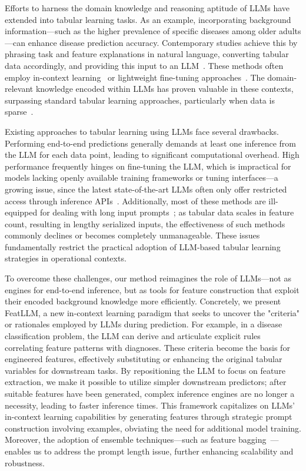 Efforts to harness the domain knowledge and reasoning aptitude of LLMs have extended into tabular learning tasks. As an example, incorporating background information—such as the higher prevalence of specific diseases among older adults—can enhance disease prediction accuracy. Contemporary studies achieve this by phrasing task and feature explanations in natural language, converting tabular data accordingly, and providing this input to an LLM~\cite{dinh2022lift,wang2023anypredict}. These methods often employ in-context learning~\cite{nam2023semi} or lightweight fine-tuning approaches~\cite{dinh2022lift,hegselmann2023tabllm}. The domain-relevant knowledge encoded within LLMs has proven valuable in these contexts, surpassing standard tabular learning approaches, particularly when data is sparse~\cite{hegselmann2023tabllm}.

Existing approaches to tabular learning using LLMs face several drawbacks. Performing end-to-end predictions generally demands at least one inference from the LLM for each data point, leading to significant computational overhead. High performance frequently hinges on fine-tuning the LLM, which is impractical for models lacking openly available training frameworks or tuning interfaces—a growing issue, since the latest state-of-the-art LLMs often only offer restricted access through inference APIs~\cite{anil2023palm,openai2023gpt4}. Additionally, most of these methods are ill-equipped for dealing with long input prompts~\cite{liu2023lost}; as tabular data scales in feature count, resulting in lengthy serialized inputs, the effectiveness of such methods commonly declines or becomes completely unmanageable. These issues fundamentally restrict the practical adoption of LLM-based tabular learning strategies in operational contexts.

To overcome these challenges, our method reimagines the role of LLMs—not as engines for end-to-end inference, but as tools for feature construction that exploit their encoded background knowledge more efficiently. Concretely, we present \textsf{FeatLLM}, a new in-context learning paradigm that seeks to uncover the "criteria" or rationales employed by LLMs during prediction. For example, in a disease classification problem, the LLM can derive and articulate explicit rules correlating feature patterns with diagnoses. These criteria become the basis for engineered features, effectively substituting or enhancing the original tabular variables for downstream tasks. By repositioning the LLM to focus on feature extraction, we make it possible to utilize simpler downstream predictors; after suitable features have been generated, complex inference engines are no longer a necessity, leading to faster inference times. This framework capitalizes on LLMs' in-context learning capabilities by generating features through strategic prompt construction involving examples, obviating the need for additional model training. Moreover, the adoption of ensemble techniques—such as feature bagging~\cite{breiman2001random}—enables us to address the prompt length issue, further enhancing scalability and robustness.

